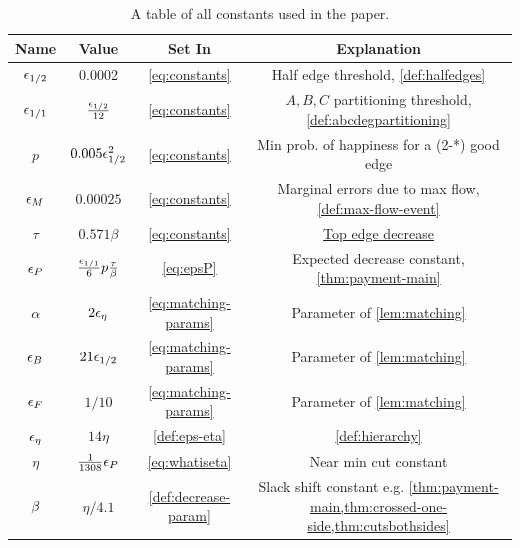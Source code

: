 \begin{table}\centering
\begin{tabular}{|c|c|c|c|}
	\hline Name & Value & Set In & Explanation\\
	\hline ${\epsilon}_{1/2}$ & 0.0002 & \ref{eq:constants} & Half edge threshold, \cref{def:halfedges}\\
	\hline ${\epsilon}_{1/1}$ & $\frac{{\epsilon}_{1/2}}{12}$ & \ref{eq:constants} & $A,B,C$ partitioning threshold, \cref{def:abcdegpartitioning} \\
	\hline $p$ & $0.005{\epsilon}_{1/2}^2$ & \ref{eq:constants} & Min prob. of happiness for a (2-*) good edge \\
	\hline ${\epsilon}_M$ & $0.00025$ & \ref{eq:constants} & Marginal errors due to max flow, \cref{def:max-flow-event} \\
	\hline $\tau$ & $0.571\beta$ & \ref{eq:constants} & \hyperlink{reduction-events}{Top edge decrease} \\ 
	\hline ${\epsilon}_P$ & $\frac{{\epsilon}_{1/1}}{6}p\frac{\tau}{\beta}$ & \eqref{eq:epsP} & Expected decrease constant, \cref{thm:payment-main}\\
	\hline $\alpha$ & $2{\epsilon}_\eta$ & \ref{eq:matching-params} & Parameter of \cref{lem:matching} \\ 
	\hline ${\epsilon}_B$ & $21{\epsilon}_{1/2}$ & \ref{eq:matching-params} & Parameter of \cref{lem:matching} \\
	\hline ${\epsilon}_F$ & $1/10$ & \ref{eq:matching-params} & Parameter of \cref{lem:matching} \\
	\hline ${\epsilon}_\eta$ & $14\eta$ & \eqref{def:eps-eta} & \cref{def:hierarchy} \\
	\hline $\eta$ & $\frac{1}{1308}{\epsilon}_P$ & \eqref{eq:whatiseta} & Near min cut constant \\
	\hline $\beta$ & $\eta/4.1$ & \eqref{def:decrease-param} & Slack shift constant e.g. \cref{thm:payment-main,thm:crossed-one-side,thm:cutsbothsides}\\
	\hline 
\end{tabular}
\caption{A table of all constants used in the paper.}\label{table:constants}
\end{table}



